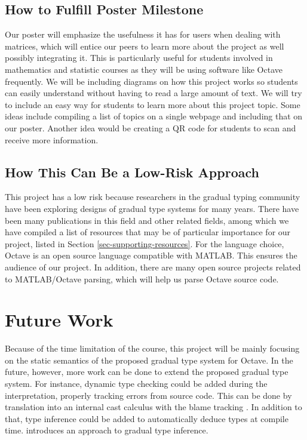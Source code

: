 \subsection{How to Fulfill Poster Milestone}
Our poster will emphasize the usefulness it has for users when dealing with
matrices, which will entice our peers to learn more about the project as well
possibly integrating it. This is particularly useful for students involved in
mathematics and statistic courses as they will be using software like Octave
frequently. We will be including diagrams on how this project works so students
can easily understand without having to read a large amount of text. We will try
to include an easy way for students to learn more about this project topic. Some
ideas include compiling a list of topics on a single webpage and including that
on our poster. Another idea would be creating a QR code for students to scan and
receive more information.

\subsection{How This Can Be a Low-Risk Approach}
This project has a low risk because researchers in the gradual typing community
have been exploring designs of gradual type systems for many years. There have
been many publications in this field and other related fields, among which we
have compiled a list of resources that may be of particular importance for our
project, listed in Section \ref{sec-supporting-resources}. For the language
choice, Octave is an open source language compatible with MATLAB. This ensures
the audience of our project. In addition, there are many open source projects
related to MATLAB/Octave parsing, which will help us parse Octave source code.

\section{Future Work}
\label{sec-future-work}
Because of the time limitation of the course, this project will be mainly
focusing on the static semantics of the proposed gradual type system for Octave.
In the future, however, more work can be done to extend the proposed gradual
type system. For instance, dynamic type checking could be added during the
interpretation, properly tracking errors from source code. This can be done by
translation into an internal cast calculus with the blame tracking
\cite{siek2015refined}. In addition to that, type inference could be added to
automatically deduce types at compile time. \cite{garcia2015principal}
introduces an approach to gradual type inference.

